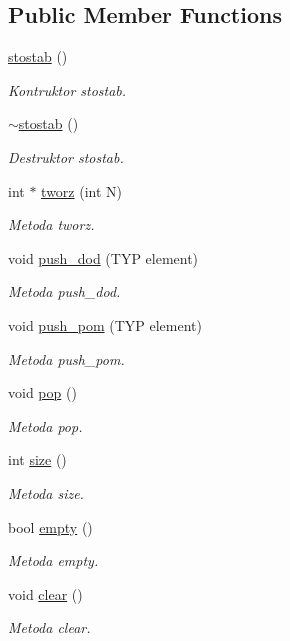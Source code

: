 \subsection*{Public Member Functions}
\begin{DoxyCompactItemize}
\item 
\hyperlink{classstostab_a496c66f7d32ff4ceb5fd833582c75e79}{stostab} ()
\begin{DoxyCompactList}\small\item\em Kontruktor stostab. \end{DoxyCompactList}\item 
\hyperlink{classstostab_a7acfb8464fb5baf7acae755d183ebf9f}{$\sim$stostab} ()
\begin{DoxyCompactList}\small\item\em Destruktor stostab. \end{DoxyCompactList}\item 
int $\ast$ \hyperlink{classstostab_a046d0ddf375c2bdd97e205c413a95402}{tworz} (int N)
\begin{DoxyCompactList}\small\item\em Metoda tworz. \end{DoxyCompactList}\item 
void \hyperlink{classstostab_a054d4e0353e199b3279a98826947e04b}{push\-\_\-dod} (T\-Y\-P element)
\begin{DoxyCompactList}\small\item\em Metoda push\-\_\-dod. \end{DoxyCompactList}\item 
void \hyperlink{classstostab_a18209a697845ec8bf1a98facd751c1e4}{push\-\_\-pom} (T\-Y\-P element)
\begin{DoxyCompactList}\small\item\em Metoda push\-\_\-pom. \end{DoxyCompactList}\item 
void \hyperlink{classstostab_ab4648e77e5d9447ef4595e4d3af90375}{pop} ()
\begin{DoxyCompactList}\small\item\em Metoda pop. \end{DoxyCompactList}\item 
int \hyperlink{classstostab_a2e0e934710c1a962b2eb74d8fa02f294}{size} ()
\begin{DoxyCompactList}\small\item\em Metoda size. \end{DoxyCompactList}\item 
bool \hyperlink{classstostab_aee2598867565da0b6fbdf248229bfa89}{empty} ()
\begin{DoxyCompactList}\small\item\em Metoda empty. \end{DoxyCompactList}\item 
void \hyperlink{classstostab_a0cb3060e73206a8a041b635729d2b738}{clear} ()
\begin{DoxyCompactList}\small\item\em Metoda clear. \end{DoxyCompactList}\end{DoxyCompactItemize}
